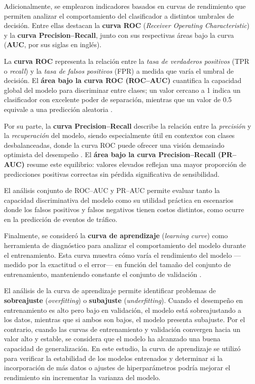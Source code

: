 \documentclass[12pt]{article}
\begin{document}
\vspace{1em}

Adicionalmente, se emplearon indicadores basados en curvas de rendimiento que permiten analizar el comportamiento del clasificador a distintos umbrales de decisión.
Entre ellas destacan la \textbf{curva ROC} (\textit{Receiver Operating Characteristic}) y la \textbf{curva Precision–Recall}, junto con sus respectivas áreas bajo la curva (\textbf{AUC}, por sus siglas en inglés).

La \textbf{curva ROC} representa la relación entre la \textit{tasa de verdaderos positivos} (TPR o \textit{recall}) y la \textit{tasa de falsos positivos} (FPR) a medida que varía el umbral de decisión.
El \textbf{área bajo la curva ROC (ROC–AUC)} cuantifica la capacidad global del modelo para discriminar entre clases; un valor cercano a 1 indica un clasificador con excelente poder de separación, mientras que un valor de 0.5 equivale a una predicción aleatoria \parencite{fawcett2006roc}.

Por su parte, la \textbf{curva Precision–Recall} describe la relación entre la \textit{precisión} y la \textit{recuperación} del modelo, siendo especialmente útil en contextos con clases desbalanceadas, donde la curva ROC puede ofrecer una visión demasiado optimista del desempeño \parencite{saito2015}.
El \textbf{área bajo la curva Precision–Recall (PR–AUC)} resume este equilibrio: valores elevados reflejan una mayor proporción de predicciones positivas correctas sin pérdida significativa de sensibilidad.

El análisis conjunto de ROC–AUC y PR–AUC permite evaluar tanto la capacidad discriminativa del modelo como su utilidad práctica en escenarios donde los falsos positivos y falsos negativos tienen costos distintos, como ocurre en la predicción de eventos de tráfico.

Finalmente, se consideró la \textbf{curva de aprendizaje} (\textit{learning curve}) como herramienta de diagnóstico para analizar el comportamiento del modelo durante el entrenamiento.
Esta curva muestra cómo varía el rendimiento del modelo —medido por la exactitud o el error— en función del tamaño del conjunto de entrenamiento, manteniendo constante el conjunto de validación \parencite{raschka2018}.

El análisis de la curva de aprendizaje permite identificar problemas de \textbf{sobreajuste} (\textit{overfitting}) o \textbf{subajuste} (\textit{underfitting}).
Cuando el desempeño en entrenamiento es alto pero bajo en validación, el modelo está sobreajustando a los datos, mientras que si ambos son bajos, el modelo presenta subajuste.
Por el contrario, cuando las curvas de entrenamiento y validación convergen hacia un valor alto y estable, se considera que el modelo ha alcanzado una buena capacidad de generalización.
En este estudio, la curva de aprendizaje se utilizó para verificar la estabilidad de los modelos entrenados y determinar si la incorporación de más datos o ajustes de hiperparámetros podría mejorar el rendimiento sin incrementar la varianza del modelo.
\end{document}
